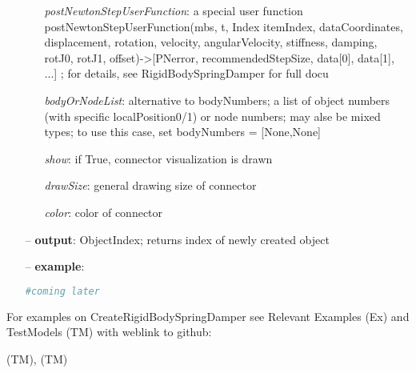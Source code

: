 \begin{itemize}[leftmargin=0.7cm]
\begin{itemize}[leftmargin=1.2cm]
\item[]{\it postNewtonStepUserFunction}: a special user function postNewtonStepUserFunction(mbs, t, Index itemIndex, dataCoordinates, displacement, rotation, velocity, angularVelocity, stiffness, damping, rotJ0, rotJ1, offset)->[PNerror, recommendedStepSize, data[0], data[1], ...] ; for details, see RigidBodySpringDamper for full docu
\item[]{\it bodyOrNodeList}: alternative to bodyNumbers; a list of object numbers (with specific localPosition0/1) or node numbers; may alse be mixed types; to use this case, set bodyNumbers = [None,None]
\item[]{\it show}: if True, connector visualization is drawn
\item[]{\it drawSize}: general drawing size of connector
\item[]{\it color}: color of connector
\end{itemize}
\item[--]
{\bf output}: ObjectIndex; returns index of newly created object
\item[--]
{\bf example}: \vspace{-12pt}\ei\begin{lstlisting}[language=Python, xleftmargin=36pt]
  #coming later
\end{lstlisting}\vspace{-24pt}\bi\item[]\vspace{-24pt}\vspace{12pt}\end{itemize}
%

%
\noindent For examples on CreateRigidBodySpringDamper see Relevant Examples (Ex) and TestModels (TM) with weblink to github:
\bi
 \item \footnotesize {} (TM), 
 (TM)
\ei


